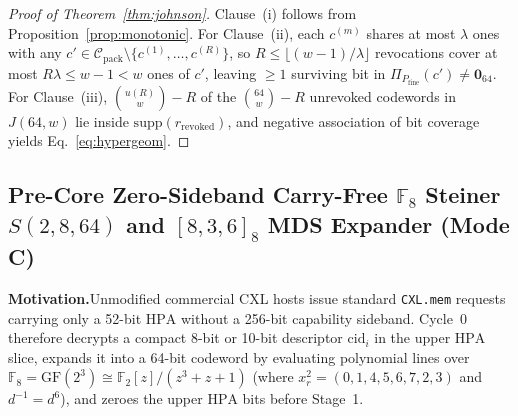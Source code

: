 \documentclass[11pt,letterpaper]{article}
\theoremstyle{spectralthm}
\begin{document}
\begin{proof}[Proof of Theorem~\ref{thm:johnson}]
Clause~(i) follows from Proposition~\ref{prop:monotonic}. For Clause~(ii), each $c^{(m)}$ shares at most $\lambda$ ones with any $c' \in \mathcal{C}_{\mathrm{pack}} \setminus \{c^{(1)},\ldots,c^{(R)}\}$, so $R \le \lfloor (w-1)/\lambda \rfloor$ revocations cover at most $R\lambda \le w - 1 < w$ ones of $c'$, leaving $\ge 1$ surviving bit in $\Pi_{P_{\mathrm{fine}}}(c') \neq \mathbf{0}_{64}$. For Clause~(iii), $\binom{u(R)}{w} - R$ of the $\binom{64}{w} - R$ unrevoked codewords in $J(64,w)$ lie inside $\mathrm{supp}(r_{\mathrm{revoked}})$, and negative association of bit coverage yields Eq.~\eqref{eq:hypergeom}.
\end{proof}

\subsection{Pre-Core Zero-Sideband Carry-Free \texorpdfstring{$\mathbb{F}_8$}{F8} Steiner \texorpdfstring{$S(2,8,64)$}{S(2,8,64)} and \texorpdfstring{$[8,3,6]_8$}{[8,3,6]8} MDS Expander (Mode C)}
\label{sec:modec}
\noindent\textbf{Motivation.}\;Unmodified commercial CXL hosts issue standard \texttt{CXL.mem} requests carrying only a 52-bit $\mathrm{HPA}$ without a 256-bit capability sideband. Cycle~0 therefore decrypts a compact 8-bit or 10-bit descriptor $\mathrm{cid}_i$ in the upper $\mathrm{HPA}$ slice, expands it into a 64-bit codeword by evaluating polynomial lines over $\mathbb{F}_8 = \mathrm{GF}(2^3) \cong \mathbb{F}_2[z]/(z^3 + z + 1)$ (where $x_r^2 = (0,1,4,5,6,7,2,3)$ and $d^{-1} = d^6$), and zeroes the upper $\mathrm{HPA}$ bits before Stage~1.\par\smallskip
\end{document}
